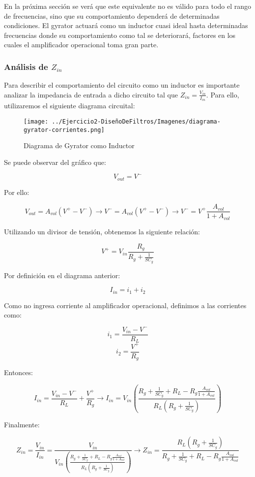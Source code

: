 En la próxima sección se verá que este equivalente no es válido para todo el rango de frecuencias, sino que su comportamiento dependerá de 
determinadas condiciones. El gyrator actuará como un inductor cuasi ideal hasta determinadas frecuencias donde su comportamiento 
como tal se deteriorará, factores en los cuales el amplificador operacional toma gran parte.

\subsubsection{Análisis de $Z_{in}$}

Para describir el comportamiento del circuito como un inductor es importante 
analizar la impedancia de entrada a dicho circuito tal que $Z_{in}=\frac{V_{in}}{I_{in}}$. 
Para ello, utilizaremos el siguiente diagrama circuital:

\begin{figure}[H]
    \centering
    \texttt{[image: ../Ejercicio2-DiseñoDeFiltros/Imagenes/diagrama-gyrator-corrientes.png]}
    \caption{Diagrama de Gyrator como Inductor}
\end{figure}

Se puede observar del gráfico que:

$$V_{out}=V^-$$

Por ello:

$$V_{out}=A_{vol}(V^+-V^-) \longrightarrow V^-=A_{vol}(V^+-V^-) 
\longrightarrow V^-= V^+ \frac{A_{vol}}{1+A_{vol}}$$

Utilizando un divisor de tensión, obtenemos la siguiente relación:

$$V^+= V_{in}\frac{R_g}{R_g+\frac{1}{SC_g}}$$

Por definición en el diagrama anterior:

$$I_{in}=i_1+i_2$$

Como no ingresa corriente al amplificador operacional, definimos a las corrientes como:

$$i_1=\frac{V_{in}-V^-}{R_L}$$
$$i_2=\frac{V^+}{R_g}$$

Entonces:

$$I_{in}=\frac{V_{in}-V^-}{R_L}+\frac{V^+}{R_g} \longrightarrow 
I_{in}=V_{in}(\frac{R_g+\frac{1}{SC_g}+R_L-R_g\frac{A_{vol}}{1+A_{vol}}}{R_L(R_g+\frac{1}{SC_g})})$$

Finalmente:

$$Z_{in}=\frac{V_{in}}{I_{in}}=\frac{V_{in}}{V_{in}(\frac{R_g+\frac{1}{SC_g}+R_L-R_g\frac{A_{vol}}{1+A_{vol}}}{R_L(R_g+\frac{1}{SC_g})})} \longrightarrow
Z_{in}=\frac{R_L(R_g+\frac{1}{SC_g})}{R_g+\frac{1}{SC_g}+R_L-R_g\frac{A_{vol}}{1+A_{vol}}}$$

